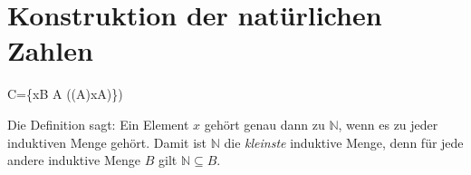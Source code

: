 \documentclass[main.tex]{subfiles}
\begin{document}
\begin{tabproof}
\end{tabproof}



\section{Konstruktion der natürlichen Zahlen}

\begin{tabproofwide}
    {}

    {}
  \proofstepwide{}{}%
    {C=\{x\in B \mid \forall A (\Induktiv(A)\rightarrow x\in A)\})}%
    {}
\end{tabproofwide}



\begin{remark}
  Die Definition sagt: Ein Element \(x\) gehört genau dann zu \(\mathbb{N}\), wenn es zu jeder induktiven Menge gehört.  Damit ist \(\mathbb{N}\) die \emph{kleinste} induktive Menge, denn für jede andere induktive Menge \(B\) gilt \(\mathbb{N} \subseteq B\).
\end{remark}

\begin{tabproofwide}
\end{tabproofwide}
\end{document}
